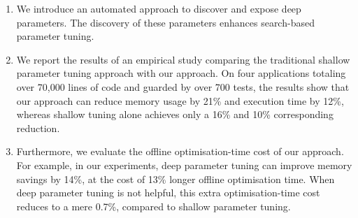 \vspace{-0.9em}
\begin{enumerate}
\setlength\itemsep{-0.3em}
\item We introduce an automated approach to discover and expose deep
parameters. The discovery of these parameters enhances search-based parameter tuning.

\item We report the results of an empirical study comparing the traditional shallow parameter tuning approach with our approach. On four applications totaling over 70,000 lines of code and guarded by over 700 tests, the results show that our approach can reduce memory usage by 21\% and execution time by 12\%, whereas shallow tuning alone achieves only a 16\% and 10\% corresponding reduction. 

\item Furthermore, we evaluate the offline optimisation-time cost of our
approach. For example, in our experiments, deep parameter tuning can
improve memory savings by 14\%, at the cost of 13\% longer 
offline optimisation time. When deep parameter tuning is not helpful, this
extra optimisation-time cost reduces to a mere 0.7\%, compared to shallow
parameter tuning.  

\end{enumerate}



